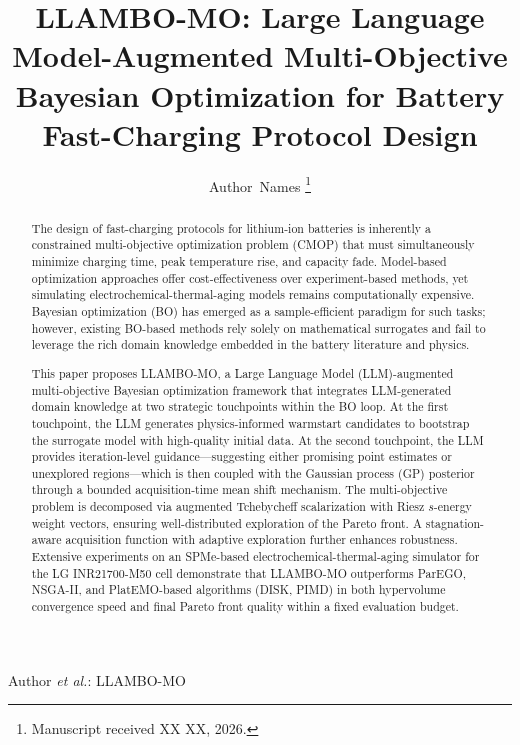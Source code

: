 \documentclass[lettersize,journal]{IEEEtran}
\begin{document}
\title{LLAMBO-MO: Large Language Model-Augmented Multi-Objective Bayesian Optimization for Battery Fast-Charging Protocol Design}

\author{Author~Names%
\thanks{Manuscript received XX XX, 2026.}}

%
{Author \MakeLowercase{\textit{et al.}}: LLAMBO-MO}

\maketitle

\begin{abstract}
The design of fast-charging protocols for lithium-ion batteries is inherently a constrained multi-objective optimization problem (CMOP) that must simultaneously minimize charging time, peak temperature rise, and capacity fade. Model-based optimization approaches offer cost-effectiveness over experiment-based methods, yet simulating electrochemical-thermal-aging models remains computationally expensive. Bayesian optimization (BO) has emerged as a sample-efficient paradigm for such tasks; however, existing BO-based methods rely solely on mathematical surrogates and fail to leverage the rich domain knowledge embedded in the battery literature and physics.

This paper proposes LLAMBO-MO, a Large Language Model (LLM)-augmented multi-objective Bayesian optimization framework that integrates LLM-generated domain knowledge at two strategic touchpoints within the BO loop. At the first touchpoint, the LLM generates physics-informed warmstart candidates to bootstrap the surrogate model with high-quality initial data. At the second touchpoint, the LLM provides iteration-level guidance---suggesting either promising point estimates or unexplored regions---which is then coupled with the Gaussian process (GP) posterior through a bounded acquisition-time mean shift mechanism. The multi-objective problem is decomposed via augmented Tchebycheff scalarization with Riesz $s$-energy weight vectors, ensuring well-distributed exploration of the Pareto front. A stagnation-aware acquisition function with adaptive exploration further enhances robustness. Extensive experiments on an SPMe-based electrochemical-thermal-aging simulator for the LG INR21700-M50 cell demonstrate that LLAMBO-MO outperforms ParEGO, NSGA-II, and PlatEMO-based algorithms (DISK, PIMD) in both hypervolume convergence speed and final Pareto front quality within a fixed evaluation budget.
\end{abstract}
\end{document}
